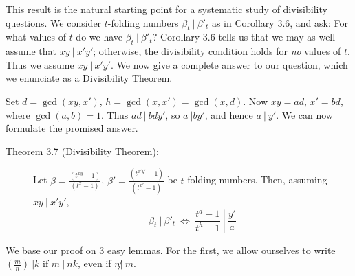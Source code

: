 This result is the natural starting point for a systematic study of divisibility questions. We consider $t$-folding numbers $\beta_{t}\ |\ \beta'_{t}$ as in Corollary 3.6, and ask: For what values of $t$ do we have $\beta_{t}\ |\ \beta'_{t}$? Corollary 3.6 tells us that we may as well assume that $xy\ |\ x' y'$; otherwise, the divisibility condition holds for \emph{no} values of $t$. Thus we assume $xy\ |\ x' y'$. We now give a complete answer to our question, which we enunciate as a Divisibility Theorem.

Set $d = \gcd(xy,x')$, $h = \gcd(x,x') = \gcd(x,d)$. Now $xy = ad$, $x' = bd$, where $\gcd(a,b) = 1$. Thus $ad\ |\ bdy'$, so $a\ | by'$, and hence $a\ |\ y'$. We can now formulate the promised answer.

\begin{description}

  \item[Theorem 3.7 (Divisibility Theorem):] Let $\beta = \frac{(t^{xy}-1)}{(t^{x}-1)}$, $\beta' = \frac{(t^{x'y'}-1)}{(t^{x'}-1)}$ be $t$-folding numbers. Then, assuming $xy\ |\ x'y'$,
    \begin{equation*}
    \beta_{t}\ |\ \beta'_{t}\ \Longleftrightarrow\ \frac{t^{d}-1}{t^{h}-1}\ \left|\ \frac{y'}{a} \right.
    \end{equation*}

\end{description}

We base our proof on 3 easy lemmas. For the first, we allow ourselves to write $\left( \frac{m}{n} \right)\ \left| k \right.$ if $m\ |\ nk$, even if $n \not|\ m$.

